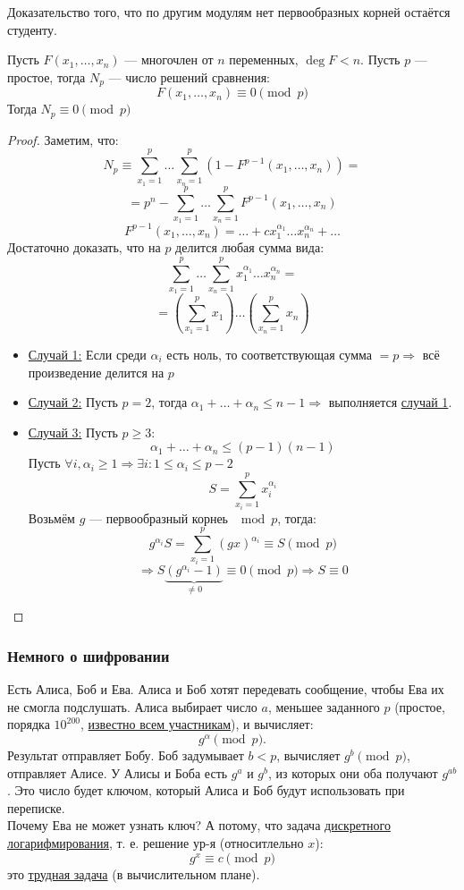 Доказательство того, что по другим модулям нет первообразных корней остаётся студенту.

\begin{theorem}[Шевалле]
\label{theorem:05_2}
Пусть $F(x_1, \ldots, x_n)$ --- многочлен от $n$ переменных, $\deg F < n$. Пусть $p$ --- простое, тогда $N_p$ --- число решений сравнения:
\[
  F(x_1, \ldots, x_n) \equiv 0 \pmod p
\]
Тогда $N_p \equiv 0 \pmod p$
\end{theorem}
\begin{proof}
Заметим, что:
\[
N_p \equiv \sum_{x_1 = 1}^{p} \ldots \sum_{x_n = 1}^{p} \left(1 - F^{p - 1}(x_1, \ldots, x_n)\right) = 
\]
\[
 = p ^{n} - \sum_{x_1 = 1}^{p} \ldots \sum_{x_n = 1}^{p} F^{p - 1}(x_1 ,\ldots, x_n)
\]
\[
  F ^{p - 1}(x_1, \ldots, x_n) = \ldots + c x_1^{\alpha_1} \ldots x_n^{\alpha_n} + \ldots
\]
Достаточно доказать, что на $p$ делится любая сумма вида:
\[
\sum_{x_1 = 1}^{p} \ldots \sum_{x_n = 1}^{p} x_1^{\alpha_1} \ldots x_n^{\alpha_n} = 
\]
\[
 = \left(\sum_{x_1 = 1}^{p} x_1\right)\ldots\left(\sum_{x_n = 1}^{p} x_n\right)
\]
\begin{itemize}
  \item \underline{Случай 1:} Если среди $\alpha_i$ есть ноль, то соответствующая сумма $ = p \Rightarrow $ всё произведение делится на $p$
  \item \underline{Случай 2:} Пусть $p = 2$, тогда $\alpha_1 + \ldots + \alpha_n \leq n - 1 \Rightarrow $ выполняется \underline{случай 1}.
  \item \underline{Случай 3:} Пусть $p \geq 3$:
    \[
      \alpha_1 + \ldots + \alpha_n \leq (p - 1)(n - 1)
    \]
    Пусть $\forall i, \alpha_i \geq 1 \Rightarrow \exists i\colon 1 \leq \alpha_i \leq p - 2$
    \[
    S = \sum_{x_i = 1}^{p} x_i^{\alpha_i}
    \]
    Возьмём $g$ --- первообразный корнеь $\mod p$, тогда:
    \[
    g^{\alpha_i} S = \sum_{x_i = 1}^{p} (gx)^{\alpha_i} \equiv S \pmod p
    \]
    \[
    \Rightarrow S\underbrace{(g^{\alpha_i} - 1)}_{\neq 0} \equiv 0 \pmod p \Rightarrow S \equiv 0
    \]
\end{itemize}
\end{proof}
\subsubsection{Немного о шифровании}
Есть Алиса, Боб и Ева. Алиса и Боб хотят передевать сообщение, чтобы Ева их не смогла подслушать. Алиса выбирает число $a$, меньшее заданного $p$ (простое, порядка $10^{200}$, \underline{известно всем участникам}), и вычисляет:
\[
  g^{\alpha} \pmod p.
\]
Результат отправляет Бобу. Боб задумывает $b < p$, вычисляет $g^{b} \pmod p$, отправляет Алисе. У Алисы и Боба есть $g^{a}$ и $g^{b}$, из которых они оба получают $g^{ab}$. Это число будет ключом, который Алиса и Боб будут использовать при переписке. \\
Почему Ева не может узнать ключ? А потому, что задача \underline{дискретного логарифмирования}, т. е. решение ур-я (относитлельно $x$):
\[
  g^{x} \equiv c \pmod p
\]
это \underline{трудная задача} (в вычислительном плане).

